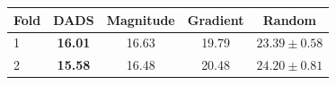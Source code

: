 \begin{tabular}{@{}lcccc@{}}
\toprule
Fold & DADS & Magnitude & Gradient & Random\\
\midrule
1 & \textbf{16.01} & 16.63 & 19.79 & $23.39\pm0.58$\\
2 & \textbf{15.58} & 16.48 & 20.48 & $24.20\pm0.81$\\
\bottomrule
\end{tabular}
